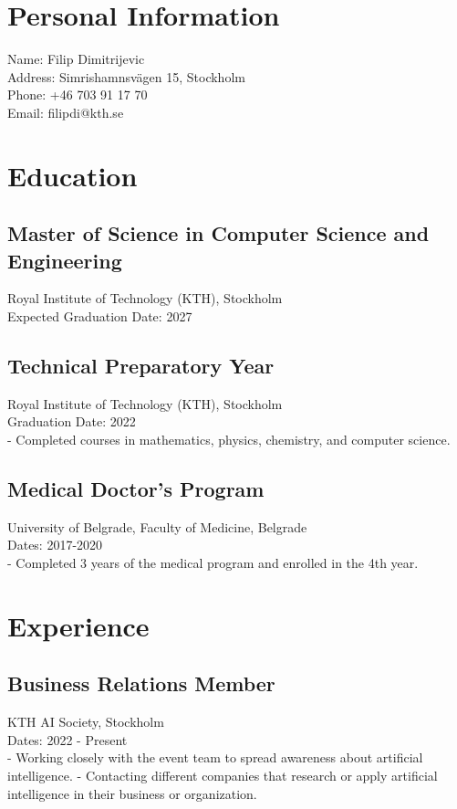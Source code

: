 \documentclass{article}
\begin{document}
\section*{Personal Information}
Name: Filip Dimitrijevic \\
Address: Simrishamnsvägen 15, Stockholm \\
Phone: +46 703 91 17 70 \\
Email: filipdi@kth.se

\section*{Education}
\subsection*{Master of Science in Computer Science and Engineering}
Royal Institute of Technology (KTH), Stockholm \\
Expected Graduation Date: 2027

\subsection*{Technical Preparatory Year}
Royal Institute of Technology (KTH), Stockholm \\
Graduation Date: 2022 \\
- Completed courses in mathematics, physics, chemistry, and computer science.

\subsection*{Medical Doctor's Program}
University of Belgrade, Faculty of Medicine, Belgrade \\
Dates: 2017-2020 \\
- Completed 3 years of the medical program and enrolled in the 4th year.

\section*{Experience}
\subsection*{Business Relations Member}
KTH AI Society, Stockholm \\
Dates: 2022 - Present \\
- Working closely with the event team to spread awareness about artificial intelligence.
- Contacting different companies that research or apply artificial intelligence in their business or organization.
\end{document}
